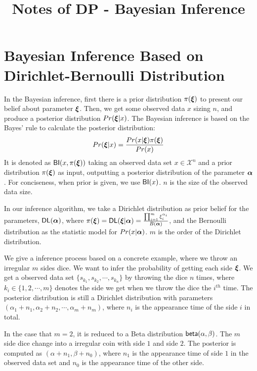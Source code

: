 

\title{\textbf{Notes of DP - Bayesian Inference}\\}
\date{\vspace{-10ex}}


\maketitle

\section{Bayesian Inference Based on Dirichlet-Bernoulli Distribution}
\label{sec_bayesInfer}
In the Bayesian inference, first there is a prior distribution $\pi(\boldsymbol{\xi})$ to present our belief about parameter $\boldsymbol{\xi}$. Then, we get some observed data $x$ sizing $n$, and produce a posterior distribution $Pr(\boldsymbol{\xi} | x)$. The Bayesian inference is based on the Bayes' rule to calculate the posterior distribution:
\begin{equation*}
Pr(\boldsymbol{\xi} | x) = \frac{Pr(x | \boldsymbol{\xi}) \pi(\boldsymbol{\xi})}{Pr(x)}
\end{equation*}
It is denoted as $\mathsf{BI}(x,\pi(\boldsymbol{\xi}))$ taking an observed data set $x \in \mathcal{X}^n$ and a prior distribution $\pi(\boldsymbol{\xi})$ as input, outputting a posterior distribution of the parameter $\boldsymbol{\alpha}$. For conciseness, when prior is given, we use $\mathsf{BI}(x)$. $n$ is the size of the observed data size.

In our inference algorithm, we take a Dirichlet distribution as prior belief for the parameters, $\mathsf{DL}(\boldsymbol{\alpha})$, where $\pi(\boldsymbol{\xi}) = \mathsf{DL}(\boldsymbol{\xi} | \boldsymbol{\alpha}) = \frac{\prod_{i = 1}^{m}\xi_i^{\alpha_i}}{B(\boldsymbol{\alpha})}$, and the Bernoulli distribution as the statistic model for $Pr(x | \boldsymbol{\alpha})$. $m$ is the order of the Dirichlet distribution.

We give a inference process based on a concrete example, where we throw an irregular $m$ sides dice. We want to infer the probability of getting each side $\boldsymbol{\xi}$. We get a observed data set $\{s_{k_1}, s_{k_2}, \cdots, s_{k_n}\}$ by throwing the dice $n$ times, where $k_i \in \{1,2,\cdots, m\}$ denotes the side we get when we throw the dice the $i^{th}$ time. The posterior distribution is still a Dirichlet distribution with parameters $(\alpha_1 + n_1, \alpha_2 + n_2, \cdots, \alpha_m + n_m)$, where $n_i$ is the appearance time of the side $i$ in total.

In the case that $m = 2$, it is reduced to a Beta distribution $\mathsf{beta}(\alpha, \beta)$. The $m$ side dice change into a irregular coin with side $1$ and side $2$. The posterior is computed as $(\alpha + n_1, \beta + n_0)$, where $n_1$ is the appearance time of side $1$ in the observed data set and $n_0$ is the appearance time of the other side.



